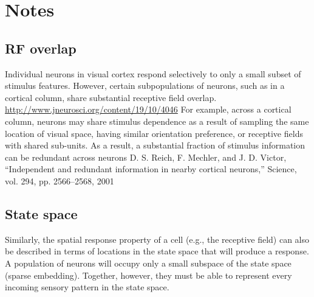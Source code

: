 \section{Notes}

\subsection{RF overlap}

Individual neurons in visual cortex respond selectively to only a small subset
of stimulus features.
However, certain subpopulations of neurons, such as in a cortical column, share substantial
receptive field overlap.
\url{http://www.jneurosci.org/content/19/10/4046}
For example, across a cortical column, neurons may share stimulus dependence
as a result of sampling the same location of visual space,
having similar orientation preference,
or receptive fields with shared sub-units.
As a result, a substantial fraction of stimulus information can be redundant
across neurons
D. S. Reich, F. Mechler, and J. D. Victor, “Independent and redundant information in nearby cortical neurons,” Science, vol. 294, pp. 2566–2568, 2001


\subsection{State space}
Similarly, the spatial response property of a cell (e.g., the receptive field)
can also be described in terms of locations in the state space that will produce
a response.
A population of neurons will occupy only a small subspace of the state space
(sparse embedding). Together, however, they must be able to represent every incoming
sensory pattern in the state space.








